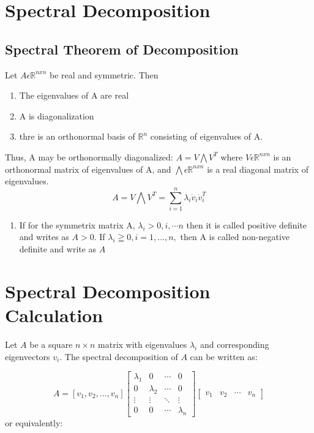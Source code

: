 \documentclass{article}
\begin{document}
\section*{Spectral Decomposition}
\subsection{Spectral Theorem of Decomposition}
Let \(A \epsilon \mathbb{R}^{nxn}\) be real and symmetric. Then
\begin{enumerate}
    \item The eigenvalues of A are real
    \item A is diagonalization
    \item thre is an orthonormal basis of \(\mathbb{R}^n\) consisting of eigenvalues of A.
\end{enumerate}
Thus, A may be orthonormally diagonalized:
\(A = V \bigwedge V^T\) where \(V \epsilon \mathbb{R}^{nxn}\) is an orthonormal matrix of eigenvalues
of A, and \(\bigwedge \epsilon \mathbb{R}^{nxn}\) is a real diagonal matrix of eigenvalues.
\[
A = V \bigwedge V^T = \sum_{i=1}^{n}\lambda_i \dot v_i \dot v_{i}^T
\]
\begin{enumerate}
    \item If for the symmetrix matrix A, \(\lambda_i >0, i, \cdots n\) then it is called positive definite and writes as 
    \(A > 0\). If \(\lambda_i \geqq 0, i=1, ..., n,\) then A is called non-negative definite and write as \(A\)
\end{enumerate}
\section*{Spectral Decomposition Calculation}
Let \( A \) be a square \( n \times n \) matrix with eigenvalues \( \lambda_i \) and corresponding eigenvectors \( v_i \). The spectral decomposition of \( A \) can be written as:

\[
A = [v_1, v_2, \dots, v_n] \begin{bmatrix}
                    \lambda_1 & 0 & \cdots & 0 \\
                    0 & \lambda_2 & \cdots & 0 \\
                    \vdots & \vdots & \ddots & \vdots \\
                    0 & 0 & \cdots & \lambda_n
                \end{bmatrix}
                \begin{bmatrix}
                    v_1 & v_2 & \cdots & v_n
                \end{bmatrix}
\]
or equivalently:
\end{document}
